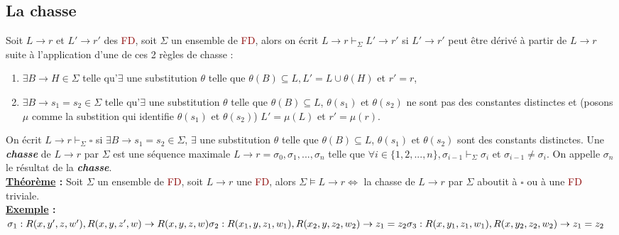 \documentclass{article}
\newcommand{\red}[1]{\textcolor{darkred}{#1}}
\begin{document}
\subsection{La chasse}

Soit $L\rightarrow r$ et $L'\rightarrow r'$ des \red{FD}, soit $\Sigma$ un ensemble de \red{FD}, alors on écrit $L\rightarrow r \vdash_\Sigma L' \rightarrow r'$ si $L' 
\rightarrow r'$ peut être dérivé à partir de $L \rightarrow r$ suite à l'application d'une de ces 2 règles de chasse : 
\begin{enumerate}
\item $\exists B \rightarrow H \in \Sigma$ telle qu'$\exists$ une substitution $\theta$ telle que $\theta(B) \subseteq L, L' = L\cup \theta(H)$ et $r'=r$,
\item $\exists B \rightarrow s_1=s_2 \in \Sigma$ telle qu'$\exists$ une substitution $\theta$ telle que $\theta(B) \subseteq L$, $\theta(s_1)$ et $\theta(s_2)$ ne sont pas 
des constantes distinctes et (posons $\mu$ comme la substition qui identifie $\theta(s_1)$ et $\theta(s_2)$)  $L'=\mu(L)$ et $r' = \mu(r)$.
\end{enumerate}
On écrit $L \rightarrow r \vdash_\Sigma \square$ si $\exists B \rightarrow s_1=s_2 \in \Sigma$, $\exists$ une substitution $\theta$ telle que $\theta(B) \subseteq L$, 
$\theta(s_1)$ et $\theta(s_2)$ sont des constants distinctes.
\noindent Une \textbf{\textit{chasse}} de $L\rightarrow r$ par $\Sigma$ est une séquence maximale $L\rightarrow r = \sigma_0,\sigma_1, ..., \sigma_n$ telle que $\forall i 
\in \{1,2,...,n\}, \sigma_{i-1} \vdash_\Sigma \sigma_i$ et $\sigma_{i-1} \neq \sigma_{i}$. On appelle $\sigma_n$ le résultat de la \textbf{\textit{chasse}}. \\

\noindent \textbf{\underline{Théorème} : } Soit $\Sigma$ un ensemble de \red{FD}, soit $L\rightarrow r$ une \red{FD}, alors $\Sigma \models L\rightarrow r 
\Leftrightarrow$ la chasse de $L\rightarrow r$ par $\Sigma$ aboutit à $\square$ ou à une \red{FD} triviale. \\

\noindent \textbf{\underline{Exemple} : } \\

\noindent$\sigma_1 : R(x, y',z, w'), R(x, y, z', w) \rightarrow R(x, y, z, w) \\
\sigma_2 : R(x_1 , y, z_1 , w_1 ), R(x_2 , y, z_2 , w_2 ) \rightarrow z_1 = z_2 \\
\sigma_3 : R(x, y_1 , z_1 , w_1 ), R(x, y_2 , z_2 , w_2 ) \rightarrow z_1 = z_2 \\$
\end{document}

